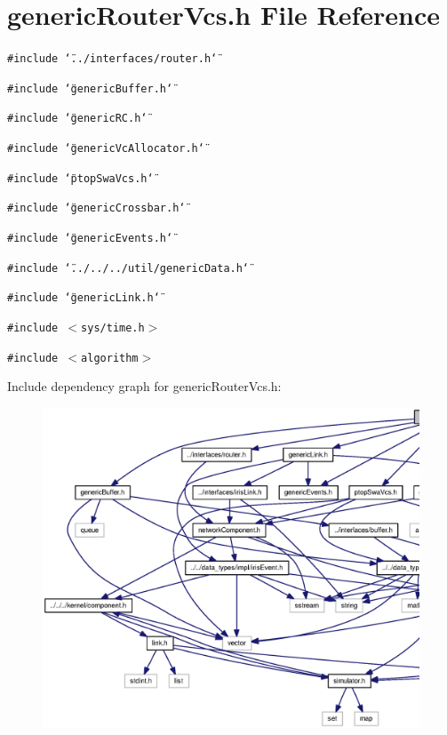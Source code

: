 \section{genericRouterVcs.h File Reference}
\label{genericRouterVcs_8h}
{\tt \#include \char`\"{}../interfaces/router.h\char`\"{}}\par
{\tt \#include \char`\"{}genericBuffer.h\char`\"{}}\par
{\tt \#include \char`\"{}genericRC.h\char`\"{}}\par
{\tt \#include \char`\"{}genericVcAllocator.h\char`\"{}}\par
{\tt \#include \char`\"{}ptopSwaVcs.h\char`\"{}}\par
{\tt \#include \char`\"{}genericCrossbar.h\char`\"{}}\par
{\tt \#include \char`\"{}genericEvents.h\char`\"{}}\par
{\tt \#include \char`\"{}../../../util/genericData.h\char`\"{}}\par
{\tt \#include \char`\"{}genericLink.h\char`\"{}}\par
{\tt \#include $<$sys/time.h$>$}\par
{\tt \#include $<$algorithm$>$}\par


Include dependency graph for genericRouterVcs.h:\nopagebreak
\begin{figure}[H]
\begin{center}
\leavevmode
\includegraphics[width=420pt]{genericRouterVcs_8h__incl}
\end{center}
\end{figure}


